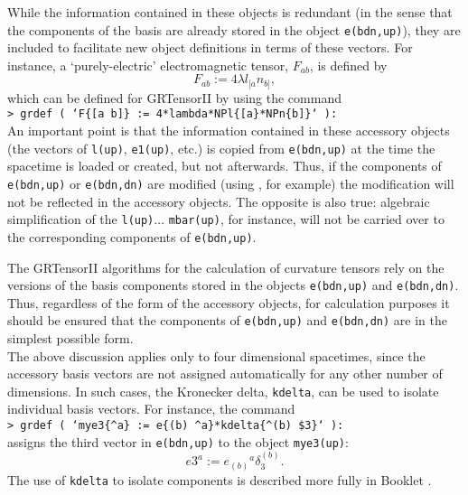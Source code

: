 \documentclass{article}
\begin{document}
While the information contained in these objects is redundant (in the
sense that the components of the basis are already stored in the
object \texttt{e(bdn,up)}), they are included to facilitate new object
definitions in terms of these vectors. For instance, a
`purely-electric' electromagnetic tensor, $F_{ab}$, is defined by
\[
  F_{ab} := 4 \lambda l_{[a} n_{b]},
\]
which can be defined for GRTensorII by using the command\\

\noindent\texttt{> grdef ( `F\{[a b]\} := 4*lambda*NPl\{[a\}*NPn\{b]\}` ):}\\

An important point is that the information contained in these
accessory objects (the vectors of \texttt{l(up)}, \texttt{e1(up)},
etc.) is copied from \texttt{e(bdn,up)} at the time the spacetime is
loaded or created, but not afterwards. Thus, if the components of
\texttt{e(bdn,up)} or \texttt{e(bdn,dn)} are modified (using
, for example) the modification will not be reflected
in the accessory objects. The opposite is also true: algebraic
simplification of the \texttt{l(up)}$\ldots$ \texttt{mbar(up)}, for
instance, will not be carried over to the corresponding components of
\texttt{e(bdn,up)}.

The GRTensorII algorithms for the calculation of curvature tensors
rely on the versions of the basis components stored in the objects
\texttt{e(bdn,up)} and \texttt{e(bdn,dn)}. Thus, regardless of the
form of the accessory objects, for calculation purposes it should be
ensured that the components of \texttt{e(bdn,up)} and
\texttt{e(bdn,dn)} are in the simplest possible form.\\

The above discussion applies only to four dimensional spacetimes,
since the accessory basis vectors are not assigned automatically for any other
number of dimensions. In such cases, the Kronecker delta,
\texttt{kdelta}, can be used to isolate individual basis vectors.
For instance, the command\\

\noindent\texttt{> grdef (
  `mye3\{\^{}a\} := e\{(b) \^{}a\}*kdelta\{\^{}(b) \$3\}` ):}\\

\noindent assigns the third vector in \texttt{e(bdn,up)} to the object
\texttt{mye3(up)}:
\[
  e3^a := e_{(b)}{}^a \delta^{(b)}_3.
\]
The use of \texttt{kdelta} to isolate components is described more
fully in Booklet \grDefRef.
\end{document}
